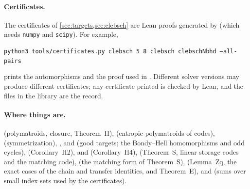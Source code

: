 \paragraph{Certificates.} The certificates of \cref{sec:targets,sec:clebsch} are Lean proofs generated by
 (which needs \texttt{numpy} and \texttt{scipy}). For example,
\begin{center}
\texttt{python3 tools/certificates.py clebsch 5 8 clebsch clebschNbhd --all-pairs}
\end{center}
prints the automorphisms and the proof used in . Different solver versions may produce
different certificates; any certificate printed is checked by Lean, and the files in the library are the record.

\paragraph{Where things are.}  (polymatroids, closure, Theorem~H), 
(entropic polymatroids of codes),  (symmetrization), ,
 and  (good targets; the Bondy--Hell homomorphisms and odd cycles),  (Corollary~H2),
 and  (Corollary~H4),  (Theorem~S, linear storage codes and the matching code),
 (the matching form of Theorem~S),
 (Lemma~Zq, the exact cases of the chain and transfer identities, and Theorem~E), and  (sums over small index sets used by the
certificates).

